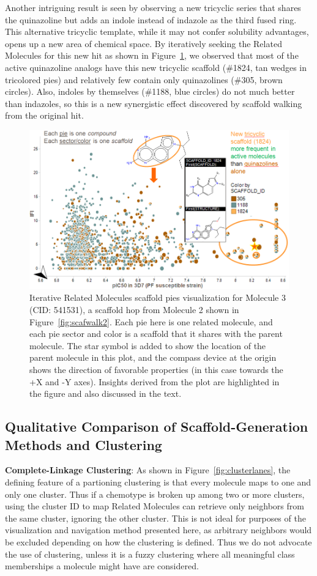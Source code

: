 \documentclass[journal=jacsat,manuscript=article]{achemso}
\newcommand*\fref[1]{Figure~\ref{fig:#1}}
\begin{document}
Another intriguing result is seen by observing a new tricyclic series that shares the quinazoline but adds an indole instead of indazole as the third fused ring. This alternative tricyclic template, while it may not confer solubility advantages, opens up a new area of chemical space. By iteratively seeking the Related Molecules for this new hit as shown in \fref{scafwalk3}, we observed that most of the active quinazoline analogs have this new tricyclic scaffold (\#1824, tan wedges in tricolored pies) and relatively few contain only quinazolines (\#305, brown circles). Also, indoles by themselves (\#1188, blue circles) do not much better than indazoles, so this is a new synergistic effect discovered by scaffold walking from the original hit.            

\begin{figure}
\includegraphics[width=6in]{fig/mol3_RGtool_scafpie_iter.png}
\caption{Iterative Related Molecules scaffold pies visualization for Molecule 3 (CID: 541531), a scaffold hop from Molecule 2 shown in \fref{scafwalk2}. Each pie here is one related molecule, and each pie sector and color is a scaffold that it shares with the parent molecule. The star symbol is added to show the location of the parent molecule in this plot, and the compass device at the origin shows the direction of favorable properties (in this case towards the +X and -Y axes). Insights derived from the plot are highlighted in the figure and also discussed in the text.}
\label{fig:scafwalk3}
\end{figure}

\subsection{Qualitative Comparison of Scaffold-Generation Methods and Clustering}
{\bf Complete-Linkage Clustering}: As shown in \fref{clusterlanes}, the defining feature of a partioning clustering is that every molecule maps to one and only one cluster. Thus if a chemotype is broken up among two or more clusters, using the cluster ID to map Related Molecules can retrieve only neighbors from the same cluster, ignoring the other cluster. This is not ideal for purposes of the visualization and navigation method presented here, as arbitrary neighbors would be excluded depending on how the clustering is defined.  Thus we do not advocate the use of clustering, unless it is a fuzzy clustering where all meaningful class memberships a molecule might have are considered. 
\end{document}
